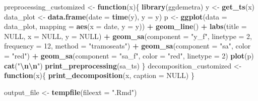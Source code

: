 \documentclass[
]{article}
\newenvironment{Shaded}{\begin{snugshade}}{\end{snugshade}}
\newcommand{\AttributeTok}[1]{\textcolor[rgb]{0.13,0.29,0.53}{#1}}
\newcommand{\ConstantTok}[1]{\textcolor[rgb]{0.56,0.35,0.01}{#1}}
\newcommand{\ControlFlowTok}[1]{\textcolor[rgb]{0.13,0.29,0.53}{\textbf{#1}}}
\newcommand{\DecValTok}[1]{\textcolor[rgb]{0.00,0.00,0.81}{#1}}
\newcommand{\FunctionTok}[1]{\textcolor[rgb]{0.13,0.29,0.53}{\textbf{#1}}}
\newcommand{\NormalTok}[1]{#1}
\newcommand{\OtherTok}[1]{\textcolor[rgb]{0.56,0.35,0.01}{#1}}
\newcommand{\SpecialCharTok}[1]{\textcolor[rgb]{0.81,0.36,0.00}{\textbf{#1}}}
\newcommand{\StringTok}[1]{\textcolor[rgb]{0.31,0.60,0.02}{#1}}
\begin{document}
\begin{Shaded}
\begin{Highlighting}[]
\NormalTok{preprocessing\_customized }\OtherTok{\textless{}{-}} \ControlFlowTok{function}\NormalTok{(x)\{}
  \FunctionTok{library}\NormalTok{(ggdemetra)}
\NormalTok{  y }\OtherTok{\textless{}{-}} \FunctionTok{get\_ts}\NormalTok{(x)}
\NormalTok{  data\_plot }\OtherTok{\textless{}{-}} \FunctionTok{data.frame}\NormalTok{(}\AttributeTok{date =} \FunctionTok{time}\NormalTok{(y), }\AttributeTok{y =}\NormalTok{ y)}
\NormalTok{  p }\OtherTok{\textless{}{-}} \FunctionTok{ggplot}\NormalTok{(}\AttributeTok{data =}\NormalTok{ data\_plot, }\AttributeTok{mapping =} \FunctionTok{aes}\NormalTok{(}\AttributeTok{x =}\NormalTok{ date, }\AttributeTok{y =}\NormalTok{ y)) }\SpecialCharTok{+}
    \FunctionTok{geom\_line}\NormalTok{() }\SpecialCharTok{+}
    \FunctionTok{labs}\NormalTok{(}\AttributeTok{title =} \ConstantTok{NULL}\NormalTok{,}
         \AttributeTok{x =} \ConstantTok{NULL}\NormalTok{, }\AttributeTok{y =} \ConstantTok{NULL}\NormalTok{) }\SpecialCharTok{+}
    \FunctionTok{geom\_sa}\NormalTok{(}\AttributeTok{component =} \StringTok{"y\_f"}\NormalTok{, }\AttributeTok{linetype =} \DecValTok{2}\NormalTok{,}
            \AttributeTok{frequency =} \DecValTok{12}\NormalTok{, }\AttributeTok{method =} \StringTok{"tramoseats"}\NormalTok{) }\SpecialCharTok{+}
    \FunctionTok{geom\_sa}\NormalTok{(}\AttributeTok{component =} \StringTok{"sa"}\NormalTok{, }\AttributeTok{color =} \StringTok{"red"}\NormalTok{) }\SpecialCharTok{+}
    \FunctionTok{geom\_sa}\NormalTok{(}\AttributeTok{component =} \StringTok{"sa\_f"}\NormalTok{, }\AttributeTok{color =} \StringTok{"red"}\NormalTok{, }\AttributeTok{linetype =} \DecValTok{2}\NormalTok{)}
  \FunctionTok{plot}\NormalTok{(p)}
  \FunctionTok{cat}\NormalTok{(}\StringTok{"}\SpecialCharTok{\textbackslash{}n\textbackslash{}n}\StringTok{"}\NormalTok{)}
  \FunctionTok{print\_preprocessing}\NormalTok{(sa\_ts)}
\NormalTok{\}}
\NormalTok{decomposition\_customized }\OtherTok{\textless{}{-}} \ControlFlowTok{function}\NormalTok{(x)\{}
  \FunctionTok{print\_decomposition}\NormalTok{(x, }\AttributeTok{caption =} \ConstantTok{NULL}\NormalTok{)}
\NormalTok{\}}

\NormalTok{output\_file }\OtherTok{\textless{}{-}} \FunctionTok{tempfile}\NormalTok{(}\AttributeTok{fileext =} \StringTok{".Rmd"}\NormalTok{)}


\end{Highlighting}
\end{Shaded}
\end{document}
